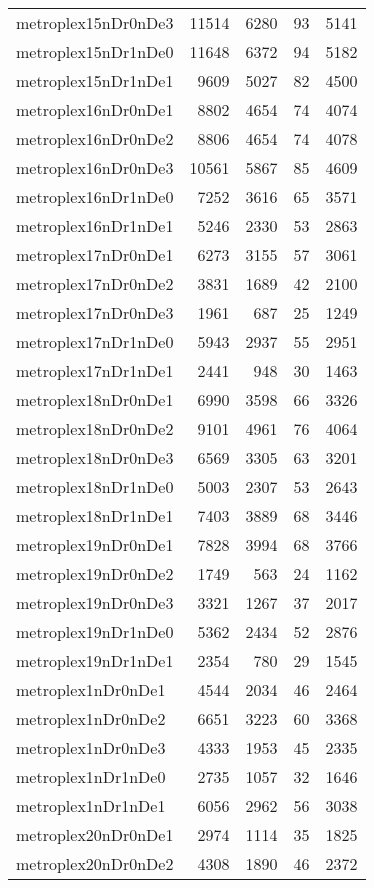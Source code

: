 \begin{longtable}{lrrrr}
metroplex15nDr0nDe3 & 11514 & 6280 & 93 & 5141 \\
metroplex15nDr1nDe0 & 11648 & 6372 & 94 & 5182 \\
metroplex15nDr1nDe1 & 9609 & 5027 & 82 & 4500 \\
metroplex16nDr0nDe1 & 8802 & 4654 & 74 & 4074 \\
metroplex16nDr0nDe2 & 8806 & 4654 & 74 & 4078 \\
metroplex16nDr0nDe3 & 10561 & 5867 & 85 & 4609 \\
metroplex16nDr1nDe0 & 7252 & 3616 & 65 & 3571 \\
metroplex16nDr1nDe1 & 5246 & 2330 & 53 & 2863 \\
metroplex17nDr0nDe1 & 6273 & 3155 & 57 & 3061 \\
metroplex17nDr0nDe2 & 3831 & 1689 & 42 & 2100 \\
metroplex17nDr0nDe3 & 1961 & 687 & 25 & 1249 \\
metroplex17nDr1nDe0 & 5943 & 2937 & 55 & 2951 \\
metroplex17nDr1nDe1 & 2441 & 948 & 30 & 1463 \\
metroplex18nDr0nDe1 & 6990 & 3598 & 66 & 3326 \\
metroplex18nDr0nDe2 & 9101 & 4961 & 76 & 4064 \\
metroplex18nDr0nDe3 & 6569 & 3305 & 63 & 3201 \\
metroplex18nDr1nDe0 & 5003 & 2307 & 53 & 2643 \\
metroplex18nDr1nDe1 & 7403 & 3889 & 68 & 3446 \\
metroplex19nDr0nDe1 & 7828 & 3994 & 68 & 3766 \\
metroplex19nDr0nDe2 & 1749 & 563 & 24 & 1162 \\
metroplex19nDr0nDe3 & 3321 & 1267 & 37 & 2017 \\
metroplex19nDr1nDe0 & 5362 & 2434 & 52 & 2876 \\
metroplex19nDr1nDe1 & 2354 & 780 & 29 & 1545 \\
metroplex1nDr0nDe1 & 4544 & 2034 & 46 & 2464 \\
metroplex1nDr0nDe2 & 6651 & 3223 & 60 & 3368 \\
metroplex1nDr0nDe3 & 4333 & 1953 & 45 & 2335 \\
metroplex1nDr1nDe0 & 2735 & 1057 & 32 & 1646 \\
metroplex1nDr1nDe1 & 6056 & 2962 & 56 & 3038 \\
metroplex20nDr0nDe1 & 2974 & 1114 & 35 & 1825 \\
metroplex20nDr0nDe2 & 4308 & 1890 & 46 & 2372 \\

\end{longtable}
